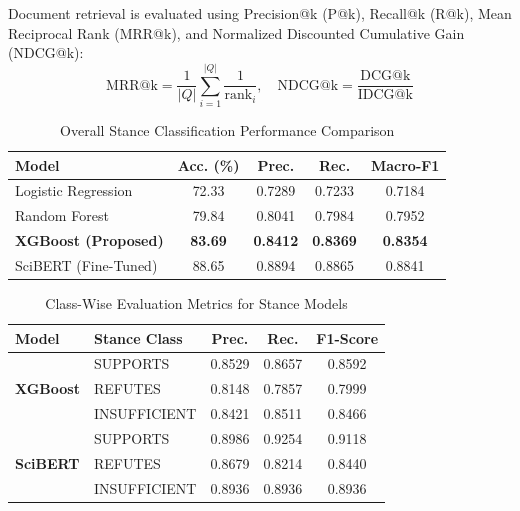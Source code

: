 \documentclass[conference]{IEEEtran}
\begin{document}
Document retrieval is evaluated using Precision@k (P@k), Recall@k (R@k), Mean Reciprocal Rank (MRR@k), and Normalized Discounted Cumulative Gain (NDCG@k):
\begin{equation}
\text{MRR@k} = \frac{1}{|Q|} \sum_{i=1}^{|Q|} \frac{1}{\text{rank}_i}, \quad \text{NDCG@k} = \frac{\text{DCG@k}}{\text{IDCG@k}}
\end{equation}

\begin{table}[t]
\centering
\caption{Overall Stance Classification Performance Comparison}
\label{tab:classification_overall}
\small
\setlength{\tabcolsep}{4.5pt}
\begin{tabular}{lcccc}
\hline
\textbf{Model} & \textbf{Acc. (\%)} & \textbf{Prec.} & \textbf{Rec.} & \textbf{Macro-F1} \\
\hline
Logistic Regression & 72.33 & 0.7289 & 0.7233 & 0.7184 \\
Random Forest & 79.84 & 0.8041 & 0.7984 & 0.7952 \\
\textbf{XGBoost (Proposed)} & \textbf{83.69} & \textbf{0.8412} & \textbf{0.8369} & \textbf{0.8354} \\
SciBERT (Fine-Tuned) & 88.65 & 0.8894 & 0.8865 & 0.8841 \\
\hline
\end{tabular}
\end{table}

\begin{table}[t]
\centering
\caption{Class-Wise Evaluation Metrics for Stance Models}
\label{tab:class_level}
\small
\setlength{\tabcolsep}{4pt}
\begin{tabular}{llccc}
\hline
\textbf{Model} & \textbf{Stance Class} & \textbf{Prec.} & \textbf{Rec.} & \textbf{F1-Score} \\
\hline
\multirow{3}{*}{\textbf{XGBoost}} 
& SUPPORTS & 0.8529 & 0.8657 & 0.8592 \\
& REFUTES & 0.8148 & 0.7857 & 0.7999 \\
& INSUFFICIENT & 0.8421 & 0.8511 & 0.8466 \\
\hline
\multirow{3}{*}{\textbf{SciBERT}} 
& SUPPORTS & 0.8986 & 0.9254 & 0.9118 \\
& REFUTES & 0.8679 & 0.8214 & 0.8440 \\
& INSUFFICIENT & 0.8936 & 0.8936 & 0.8936 \\
\hline
\end{tabular}
\end{table}
\end{document}
